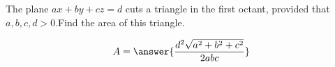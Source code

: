 \documentclass{ximera}
\author{David Guichard \and Neal Koblitz \and H. Jerome Keisler \and Albert Scheller \and Barry Balof \and Mike Wills \and Matthew Carr}
\begin{document}
\begin{exercise}





The plane $ax+by+cz=d$ cuts a triangle in the first octant, provided that $a,b,c,d>0$.Find the area of this triangle.

\begin{prompt}
\[
A=\answer{\frac{d^2\sqrt{a^2+b^2+c^2}}{2abc}}
\]
\end{prompt}



\end{exercise}
\end{document}

